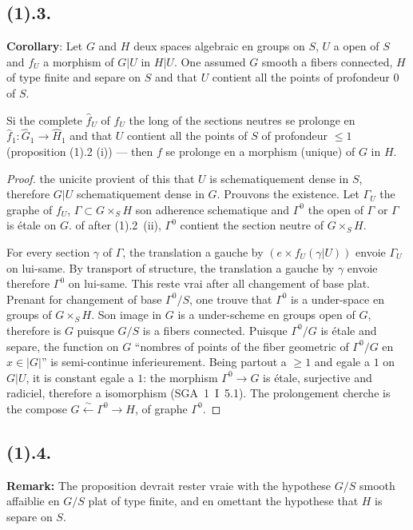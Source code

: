 \documentclass[12pt,a4paper]{article}
\theoremstyle{plain}
\theoremstyle{definition}
\theoremstyle{remark}
\begin{document}
\subsection*{\textbf{(1).3.}}
\textbf{Corollary}: Let $G$ and $H$ deux spaces algebraic en groups on $S$, $U$ a open of $S$ and $f_U$ a morphism of $G|U$ in $H|U$. One assumed $G$ smooth a fibers connected, $H$ of type finite and separe on $S$ and that $U$ contient all the points of profondeur $0$ of $S$.

Si the complete $\hat{f}_U$ of $f_U$ the long of the sections neutres se prolonge en $\hat{f}_1 : \hat{G}_1 \to \hat{H}_1$ and that $U$ contient all the points of $S$ of profondeur $\leq 1$ (proposition (1).2 (i)) --- then $f$ se prolonge en a morphism (unique) of $G$ in $H$.

\begin{proof}
the unicite provient of this that $U$ is schematiquement dense in $S$, therefore $G|U$ schematiquement dense in $G$. Prouvons the existence. Let $\Gamma_U$ the graphe of $f_U$, $\Gamma \subset G \times_S H$ son adherence schematique and $\Gamma^0$ the open of $\Gamma$ or $\Gamma$ is étale on $G$. of after (1).2~(ii), $\Gamma^0$ contient the section neutre of $G \times_S H$.

For every section $\gamma$ of $\Gamma$, the translation a gauche by $(e \times f_U(\gamma|U))$ envoie $\Gamma_U$ on lui-same. By transport of structure, the translation a gauche by $\gamma$ envoie therefore $\Gamma^0$ on lui-same. This reste vrai after all changement of base plat. Prenant for changement of base $\Gamma^0/S$, one trouve that $\Gamma^0$ is a under-space en groups of $G \times_S H$. Son image in $G$ is a under-scheme en groups open of $G$, therefore is $G$ puisque $G/S$ is a fibers connected. Puisque $\Gamma^0/G$ is étale and separe, the function on $G$ ``nombres of points of the fiber geometric of $\Gamma^0/G$ en $x \in |G|$'' is semi-continue inferieurement. Being partout a $\geq 1$ and egale a $1$ on $G|U$, it is constant egale a $1$: the morphism $\Gamma^0 \to G$ is étale, surjective and radiciel, therefore a isomorphism (SGA~1~I~5.1). The prolongement cherche is the compose $G \xleftarrow{\sim} \Gamma^0 \longrightarrow H$, of graphe $\Gamma^0$.
\end{proof}

\subsection*{\textbf{(1).4.}}
\textbf{Remark:} The proposition devrait rester vraie with the hypothese $G/S$ smooth affaiblie en $G/S$ plat of type finite, and en omettant the hypothese that $H$ is separe on $S$.
\end{document}
